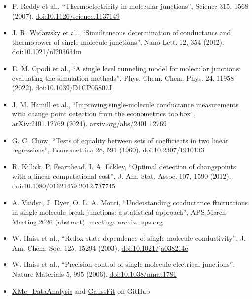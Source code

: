 \documentclass[
  11pt,
  a4paper,
]{article}
\begin{document}
\begin{itemize}
\item
  P. Reddy et al., ``Thermoelectricity in molecular junctions'', Science
  315, 1568 (2007).
  \href{https://doi.org/10.1126/science.1137149}{doi:10.1126/science.1137149}
\item
  J. R. Widawsky et al., ``Simultaneous determination of conductance and
  thermopower of single molecule junctions'', Nano Lett. 12, 354 (2012).
  \href{https://doi.org/10.1021/nl203634m}{doi:10.1021/nl203634m}
\item
  E. M. Opodi et al., ``A single level tunneling model for molecular
  junctions: evaluating the simulation methods'', Phys. Chem. Chem.
  Phys. 24, 11958 (2022).
  \href{https://doi.org/10.1039/D1CP05807J}{doi:10.1039/D1CP05807J}
\item
  J. M. Hamill et al., ``Improving single-molecule conductance
  measurements with change point detection from the econometrics
  toolbox'', arXiv:2401.12769 (2024).
  \href{https://arxiv.org/abs/2401.12769}{arxiv.org/abs/2401.12769}
\item
  G. C. Chow, ``Tests of equality between sets of coefficients in two
  linear regressions'', Econometrica 28, 591 (1960).
  \href{https://doi.org/10.2307/1910133}{doi:10.2307/1910133}
\item
  R. Killick, P. Fearnhead, I. A. Eckley, ``Optimal detection of
  changepoints with a linear computational cost'', J. Am. Stat. Assoc.
  107, 1590 (2012).
  \href{https://doi.org/10.1080/01621459.2012.737745}{doi:10.1080/01621459.2012.737745}
\item
  A. Vaidya, J. Dyer, O. L. A. Monti, ``Understanding conductance
  fluctuations in single-molecule break junctions: a statistical
  approach'', APS March Meeting 2026 (abstract).
  \href{https://meetings-archive.aps.org/smt/2026/mar-s71/8/}{meetings-archive.aps.org}
\item
  W. Haiss et al., ``Redox state dependence of single molecule
  conductivity'', J. Am. Chem. Soc. 125, 15294 (2003).
  \href{https://doi.org/10.1021/ja038214e}{doi:10.1021/ja038214e}
\item
  W. Haiss et al., ``Precision control of single-molecule electrical
  junctions'', Nature Materials 5, 995 (2006).
  \href{https://doi.org/10.1038/nmat1781}{doi:10.1038/nmat1781}
\item
  \href{https://github.com/Pilab-XMU/XMe_DataAnalysis}{XMe\_DataAnalysis}
  and \href{https://github.com/rchiechi/gaussfit}{GaussFit} on GitHub
\end{itemize}
\end{document}
